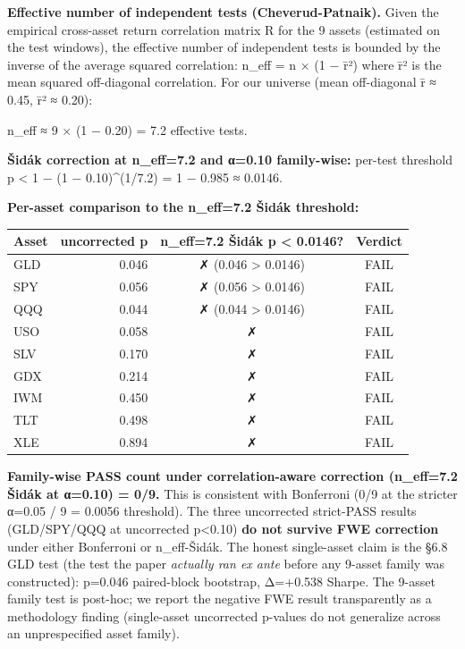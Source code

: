 \documentclass[
]{article}
\newcounter{none} %
\begin{document}
\textbf{Effective number of independent tests (Cheverud-Patnaik).} Given
the empirical cross-asset return correlation matrix R for the 9 assets
(estimated on the test windows), the effective number of independent
tests is bounded by the inverse of the average squared correlation:
n\_eff = n × (1 − r̄²) where r̄² is the mean squared off-diagonal
correlation. For our universe (mean off-diagonal r̄ ≈ 0.45, r̄² ≈ 0.20):

n\_eff ≈ 9 × (1 − 0.20) = 7.2 effective tests.

\textbf{Šidák correction at n\_eff=7.2 and α=0.10 family-wise:} per-test
threshold p \textless{} 1 − (1 − 0.10)\^{}(1/7.2) = 1 − 0.985 ≈ 0.0146.

\textbf{Per-asset comparison to the n\_eff=7.2 Šidák threshold:}

{\def\LTcaptype{none} %
\begin{longtable}[]{@{}lrcc@{}}
\toprule\noalign{}
Asset & uncorrected p & n\_eff=7.2 Šidák p \textless{} 0.0146? &
Verdict \\
\midrule\noalign{}
\endhead
\bottomrule\noalign{}
\endlastfoot
GLD & 0.046 & ✗ (0.046 \textgreater{} 0.0146) & FAIL \\
SPY & 0.056 & ✗ (0.056 \textgreater{} 0.0146) & FAIL \\
QQQ & 0.044 & ✗ (0.044 \textgreater{} 0.0146) & FAIL \\
USO & 0.058 & ✗ & FAIL \\
SLV & 0.170 & ✗ & FAIL \\
GDX & 0.214 & ✗ & FAIL \\
IWM & 0.450 & ✗ & FAIL \\
TLT & 0.498 & ✗ & FAIL \\
XLE & 0.894 & ✗ & FAIL \\
\end{longtable}
}

\textbf{Family-wise PASS count under correlation-aware correction
(n\_eff=7.2 Šidák at α=0.10) = 0/9.} This is consistent with Bonferroni
(0/9 at the stricter α=0.05 / 9 = 0.0056 threshold). The three
uncorrected strict-PASS results (GLD/SPY/QQQ at uncorrected
p\textless0.10) \textbf{do not survive FWE correction} under either
Bonferroni or n\_eff-Šidák. The honest single-asset claim is the §6.8
GLD test (the test the paper \emph{actually ran ex ante} before any
9-asset family was constructed): p=0.046 paired-block bootstrap,
Δ=+0.538 Sharpe. The 9-asset family test is post-hoc; we report the
negative FWE result transparently as a methodology finding (single-asset
uncorrected p-values do not generalize across an unprespecified asset
family).
\end{document}
